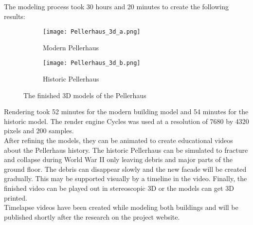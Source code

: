 The modeling process took 30 hours and 20 minutes to create the following results:

\begin{figure}[h]
	\centering
	\begin{subfigure}[b]{0.75\textwidth}
		\centering
		\texttt{[image: Pellerhaus\_3d\_a.png]}
		\caption{Modern Pellerhaus}
		\label{fig:pellerhaus_3d_modern}
	\end{subfigure}
	\hfill
	\begin{subfigure}[b]{0.75\textwidth}
		\centering
		\texttt{[image: Pellerhaus\_3d\_b.png]}
		\caption{Historic Pellerhaus}
		\label{fig:pellerhaus_3d_historic}
	\end{subfigure}
	\caption{The finished 3D models of the Pellerhaus}
	\label{fig:pellerhaus_3d_models}
\end{figure}

Rendering took 52 minutes for the modern building model and 54 minutes for the historic model. The render engine Cycles was used at a resolution of 7680 by 4320 pixels and 200 samples.\\

After refining the models, they can be animated to create educational videos about the Pellerhaus history. The historic Pellerhaus can be simulated to fracture and collapse during World War II only leaving debris and major parts of the ground floor. The debris can disappear slowly and the new facade will be created gradually. This may be supported visually by a timeline in the video. Finally, the finished video can be played out in stereoscopic 3D or the models can get 3D printed.\\

Timelapse videos have been created while modeling both buildings and will be published shortly after the research on the project website.
